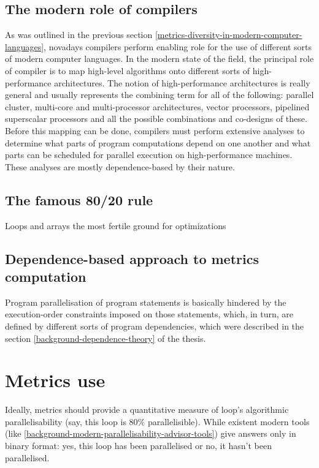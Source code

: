 \subsection{The modern role of compilers}
\quad As was outlined in the previous section \ref{metrics-diversity-in-modern-computer-languages}, novadays compilers perform enabling role for the use of different sorts of modern computer languages. \newline
\null\quad In the modern state of the field, the principal role of compiler is to map high-level algorithms onto different sorts of high-performance architectures. The notion of high-performance architectures is really general and usually represents the combining term for all of the following: parallel cluster, multi-core and multi-processor architectures, vector processors, pipelined superscalar processors and all the possible combinations and co-designs of these. \newline
\null\quad Before this mapping can be done, compilers must perform extensive analyses to determine what parts of program computations depend on one another and what parts can be scheduled for parallel execution on high-performance machines. These analyses are mostly dependence-based by their nature.   

\subsection{The famous 80/20 rule}
\qquad Loops and arrays the most fertile ground for optimizations

\subsection{Dependence-based approach to metrics computation}
\qquad Program parallelisation of program statements is basically hindered by the execution-order constraints imposed on those statements, which, in turn, are defined by different sorts of program dependencies, which were described in the section \ref{background-dependence-theory} of the thesis.   

\section{Metrics use}
\qquad Ideally, metrics should provide a quantitative measure of loop's algorithmic parallelisability (say, this loop is 80\% parallelisible). While existent modern tools (like \ref{background-modern-parallelisability-advisor-tools}) give answers only in binary format: yes, this loop has been parallelised or no, it hasn't been parallelised.

